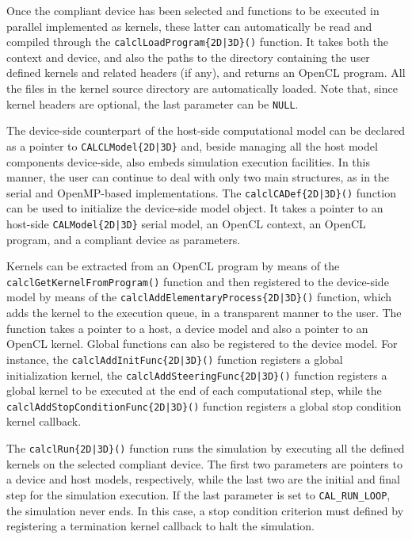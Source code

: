 Once the compliant device has been selected and functions to be
executed in parallel implemented as kernels, these latter can
automatically be read and compiled through the
\verb'calclLoadProgram{2D|3D}()' function. It takes both the
context and device, and also the paths to the directory containing
the user defined kernels and related headers (if any), and returns
an OpenCL program. All the files in the kernel source directory
are automatically loaded. Note that, since kernel headers are
optional, the last parameter can be \verb'NULL'.

The device-side counterpart of the host-side computational model
can be declared as a pointer to \verb'CALCLModel{2D|3D}' and,
beside managing all the host model components device-side, also
embeds simulation execution facilities. In this manner, the user
can continue to deal with only two main structures, as in the
serial and OpenMP-based implementations. The
\verb'calclCADef{2D|3D}()' function can be used to initialize the
device-side model object. It takes a pointer to an host-side
\verb'CALModel{2D|3D}' serial model, an OpenCL context, an OpenCL
program, and a compliant device as parameters.

Kernels can be extracted from an OpenCL program by means of the\hfil \\
\verb'calclGetKernelFromProgram()' function and then registered to
the device-side model by means of the
\verb'calclAddElementaryProcess{2D|3D}()' function, which adds the
kernel to the execution queue, in a transparent manner to the
user. The function takes a pointer to a host, a device model and
also a pointer to an OpenCL kernel. Global functions can also be
registered to the device model. For instance, the
\verb'calclAddInitFunc{2D|3D}()' function registers a global
initialization kernel, the \verb'calclAddSteeringFunc{2D|3D}()'
function registers a global kernel to be executed at the end of
each computational step, while the
\verb'calclAddStopConditionFunc{2D|3D}()' function registers a
global stop condition kernel callback.

The \verb'calclRun{2D|3D}()' function runs the simulation by
executing all the defined kernels on the selected compliant
device. The first two parameters are pointers to a device and host
models, respectively, while the last two are the initial and final
step for the simulation execution. If the last parameter is set to
\verb'CAL_RUN_LOOP', the simulation never ends. In this case, a
stop condition criterion must defined by registering a termination
kernel callback to halt the simulation.


